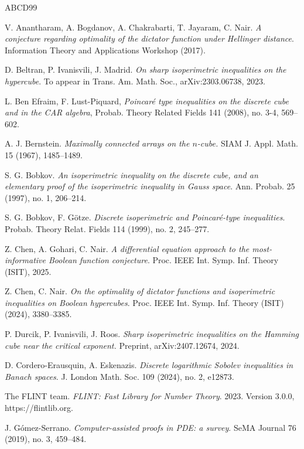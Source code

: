 \documentclass[11pt]{amsart}
\theoremstyle{plain}
\theoremstyle{definition}
\theoremstyle{remark}
\numberwithin{equation}{section}
\begin{document}
\begin{thebibliography}{ABCD99}

V. Anantharam, A. Bogdanov, A. Chakrabarti, T. Jayaram, C. Nair. {\em A conjecture regarding optimality of the dictator function under Hellinger distance}. Information Theory and Applications Workshop (2017).

D. Beltran, P. Ivanisvili, J. Madrid. {\em On sharp isoperimetric inequalities on the hypercube}. To appear in Trans. Am. Math. Soc., arXiv:2303.06738, 2023.

 L. Ben Efraim, F. Lust-Piquard, {\em Poincar\'e type inequalities on the discrete cube and in the CAR algebra}, Probab. Theory Related Fields 141 (2008), no. 3-4, 569--602.

 A. J. Bernstein. \emph{Maximally connected arrays on the $n$-cube.} SIAM J. Appl. Math. 15 (1967), 1485--1489.

 S. G. Bobkov.
{\em An isoperimetric inequality on the discrete cube, and an elementary proof of the isoperimetric inequality in Gauss space}. Ann. Probab. 25 (1997), no. 1, 206--214.

S. G. Bobkov, F. G{\"o}tze. {\em Discrete isoperimetric and Poincar{\'e}-type inequalities}. Probab. Theory Relat. Fields 114 (1999), no. 2, 245--277.

Z. Chen, A. Gohari, C. Nair. {\em A differential equation approach to the most-informative Boolean function conjecture}. Proc. IEEE Int. Symp. Inf. Theory (ISIT), 2025.

Z. Chen, C. Nair. {\em On the optimality of dictator functions and isoperimetric inequalities on Boolean hypercubes}. Proc. IEEE Int. Symp. Inf. Theory (ISIT) (2024), 3380--3385.

 P. Durcik, P. Ivanisvili, J. Roos. {\em Sharp isoperimetric inequalities on the Hamming cube near the critical exponent.} Preprint, arXiv:2407.12674, 2024.

 D. Cordero-Erausquin, A. Eskenazis. {\em Discrete logarithmic Sobolev inequalities in Banach spaces}. J. London Math. Soc. 109 (2024), no. 2, e12873.

 The FLINT team. {\em FLINT: Fast Library for Number Theory}. 2023. Version 3.0.0, https://flintlib.org.

 J. G\'omez-Serrano. \emph{Computer-assisted proofs in PDE: a survey}.
SeMA Journal 76 (2019), no. 3, 459--484.


\end{thebibliography}
\end{document}
